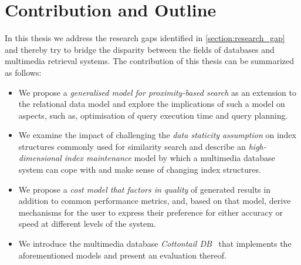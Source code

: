 


\section{Contribution and Outline}
\label{section:contributions}

In this thesis we address the research gaps identified in \cref{section:research_gap} and thereby try to bridge the disparity between the fields of databases and multimedia retrieval systems. The contribution of this thesis can be summarized as follows:

\begin{itemize}
    \item We propose a \emph{generalised model for proximity-based search} as an extension to the relational data model and explore the implications of such a model on aspects, such as, optimisation of query execution time and query planning.
    \item We examine the impact of challenging the \emph{data staticity assumption} on index structures commonly used for similarity search and describe an \emph{high-dimensional index maintenance} model by which a multimedia database system can cope with and make sense of changing index structures.
    \item We propose a \emph{cost model that factors in quality} of generated results in addition to common performance metrics, and, based on that model, derive mechanisms for the user to express their preference for either accuracy or speed at different levels of the system.
    \item We introduce the multimedia database \emph{Cottontail DB}~\cite{Gasser:2020Cottontail} that implements the aforementioned models and present an evaluation thereof.
\end{itemize}

